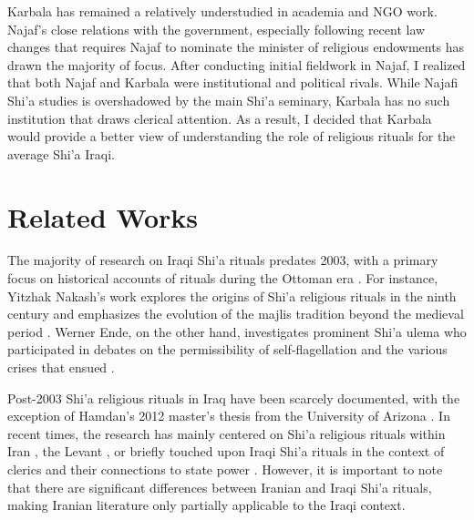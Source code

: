 Karbala has remained a relatively understudied in academia and NGO work. Najaf's close relations with the government, especially following recent law changes that requires Najaf to nominate the minister of religious endowments \cite{hamoudi_engagements_2020} has drawn the majority of focus. After conducting initial fieldwork in Najaf, I realized that both Najaf and Karbala were institutional and political rivals. While Najafi Shi'a studies is overshadowed by the main Shi'a seminary, Karbala has no such institution that draws clerical attention. As a result, I decided that Karbala would provide a better view of understanding the role of religious rituals for the average Shi'a Iraqi. 


\section{Related Works}
The majority of research on Iraqi Shi'a rituals predates 2003, with a primary focus on historical accounts of rituals during the Ottoman era \cite{nakash_shiis_1994} \cite{brunner_twelver_2001} \cite{ayoub_redemptive_1978}. For instance, Yitzhak Nakash's work explores the origins of Shi'a religious rituals in the ninth century and emphasizes the evolution of the majlis tradition beyond the medieval period \cite[164]{yitzhak_nakash_attempt_1993}. Werner Ende, on the other hand, investigates prominent Shi'a ulema who participated in debates on the permissibility of self-flagellation and the various crises that ensued \cite{ende_flagellations_1978}. 

Post-2003 Shi'a religious rituals in Iraq have been scarcely documented, with the exception of Hamdan's 2012 master's thesis from the University of Arizona \cite{hamdan_development_2012}. In recent times, the research has mainly centered on Shi'a religious rituals within Iran \cite{dabashi_taziyeh_2005} \cite{aghaie_martyrs_2004} \cite{flaskerud_visualizing_2012} \cite{saramifar_circling_2020}, the Levant \cite{weiss_shadow_2010} \cite{szanto_beyond_2013}, or briefly touched upon Iraqi Shi'a rituals in the context of clerics and their connections to state power \cite{nakash_reaching_2006} \cite{davis_memories_2005} \cite{cole_ayatollahs_2006}. However, it is important to note that there are significant differences between Iranian and Iraqi Shi'a rituals, making Iranian literature only partially applicable to the Iraqi context.

